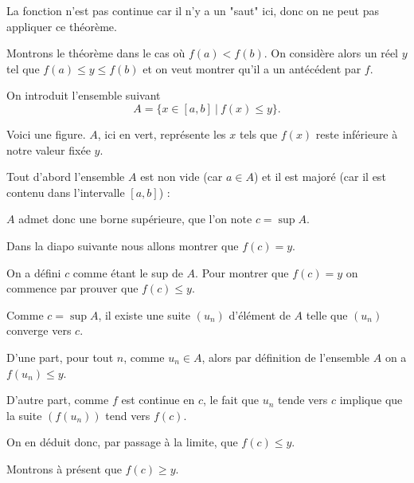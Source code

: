 La fonction n'est pas continue car  il n'y a un "saut" ici,
donc on ne peut pas appliquer ce théorème.




\diapo

Montrons le théorème dans le cas où $f(a)<f(b)$. On considère alors un réel $y$ tel que 
$f(a)\leq y\leq f(b)$ et on veut montrer qu'il a un antécédent par $f$.

\change

On introduit l'ensemble suivant
\[
A=\Big\{ x\in [a,b] \ \vert \ f(x)\leq y \Big\}.
\]

\change

Voici une figure. $A$, ici en vert, représente les $x$ tels que $f(x)$ reste inférieure à notre valeur fixée $y$.

\change

Tout d'abord l'ensemble $A$ est non vide (car $a\in A$) et il est majoré (car il est 
contenu dans l'intervalle $[a,b] $) :

\change

$A$ admet donc une borne supérieure, que l'on note 
$c=\sup A$. 

\change

Dans la diapo suivante nous allons montrer que $f(c)=y$.

\diapo

\change

On a défini  $c$ comme étant le sup de $A$.
Pour montrer que $f(c)=y$ on commence par prouver que $f(c)\leq y$. 

\change

Comme $c=\sup A$, il existe une suite 
$(u_n)$ d'élément de $A$ telle que $(u_n)$ converge vers $c$. 


\change

D'une part, pour tout $n$, comme $u_n\in A$, alors par définition de 
l'ensemble $A$ on a $f(u_n)\leq y$. 

\change

D'autre part, comme $f$ est continue en $c$, le fait que $u_n$ tende vers $c$
implique que la suite $\left(f(u_n)\right)$ 
tend vers $f(c)$.


\change
 On en déduit donc, par passage à la limite, que $f(c)\leq y$.
 
\change

Montrons à présent que $f(c)\geq y$.


\change

